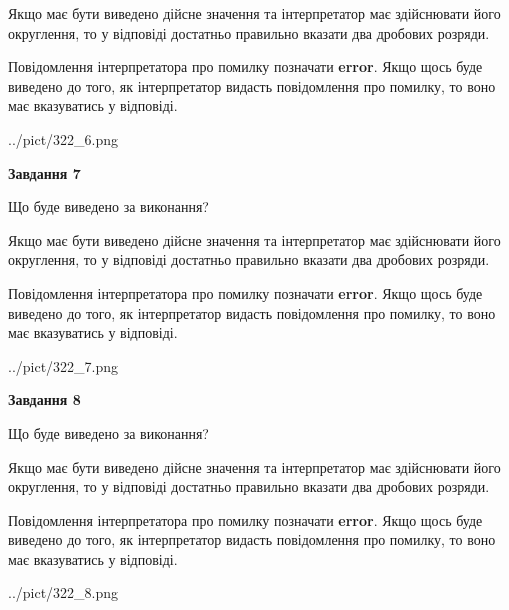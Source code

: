 \documentclass[12pt, ukrainian]{article}
\begin{document}
{\begin {Large}
Якщо має бути виведено дійсне значення та інтерпретатор має здійснювати його округлення, 
то у відповіді достатньо правильно вказати два дробових розряди.

Повідомлення інтерпретатора про помилку позначати \textbf{error}.
Якщо щось буде виведено до того, як інтерпретатор видасть повідомлення про помилку, 
то воно має вказуватись у відповіді. \par

\begin{center}
	{../pict/322_6.png}
\end{center}
\newpage

{\begin {center}\textbf{Завдання 7}\end {center}}\par
Що буде виведено за виконання? \par

Якщо має бути виведено дійсне значення та інтерпретатор має здійснювати його округлення, 
то у відповіді достатньо правильно вказати два дробових розряди.

Повідомлення інтерпретатора про помилку позначати \textbf{error}.
Якщо щось буде виведено до того, як інтерпретатор видасть повідомлення про помилку, 
то воно має вказуватись у відповіді. \par

\begin{center}
	{../pict/322_7.png}
\end{center}
\newpage

{\begin {center}\textbf{Завдання 8}\end {center}}\par
Що буде виведено за виконання? \par

Якщо має бути виведено дійсне значення та інтерпретатор має здійснювати його округлення, 
то у відповіді достатньо правильно вказати два дробових розряди.

Повідомлення інтерпретатора про помилку позначати \textbf{error}.
Якщо щось буде виведено до того, як інтерпретатор видасть повідомлення про помилку, 
то воно має вказуватись у відповіді. \par

\begin{center}
	{../pict/322_8.png}
\end{center}
\newpage


\end{Large}}
\end{document}
